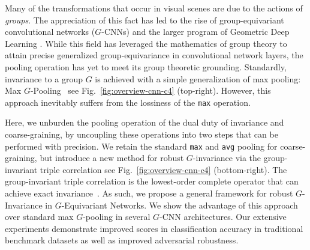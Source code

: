

Many of the transformations that occur in visual scenes are due to the actions of \textit{groups}. The appreciation of this fact has led to the rise of group-equivariant convolutional networks ($G$-CNNs) \cite{cohen2016group} and the larger program of Geometric Deep Learning \cite{bronstein2021geometric}. While this field has leveraged the mathematics of group theory to attain precise generalized group-equivariance in convolutional network layers, the pooling operation has yet to meet its group theoretic grounding. Standardly, invariance to a group $G$ is achieved with a simple generalization of max pooling: Max $G$-Pooling~\cite{cohen2016group} \textemdash see Fig.~\ref{fig:overview-cnn-c4} (top-right). However, this approach inevitably suffers from the lossiness of the \texttt{max} operation.

Here, we unburden the pooling operation of the dual duty of invariance and coarse-graining, by uncoupling these operations into two steps that can be performed with precision. We retain the standard \texttt{max} and \texttt{avg} pooling for coarse-graining, but introduce a new method for robust $G$-invariance via the group-invariant triple correlation \textemdash see Fig.~\ref{fig:overview-cnn-c4} (bottom-right). The group-invariant triple correlation is the lowest-order complete operator that can achieve exact invariance~\cite{kakarala1992triple}. As such, we propose a general framework for robust $G$-Invariance in $G$-Equivariant Networks.
We show the advantage of this approach over standard max $G$-pooling in several $G$-CNN architectures. Our extensive experiments demonstrate improved scores in classification accuracy in traditional benchmark datasets as well as improved adversarial robustness.

